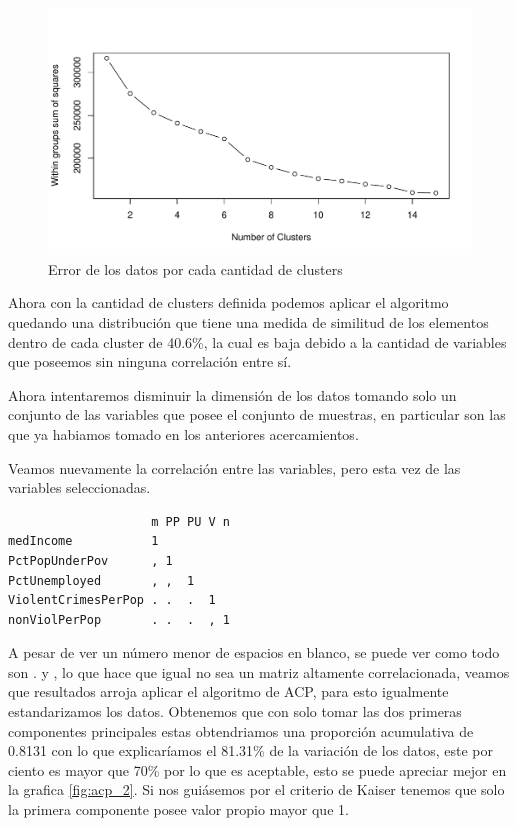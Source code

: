 \documentclass[a4paper,10pt,twocolumn]{article}
\begin{document}
	\begin{figure}[htb]
		\begin{center}
			\includegraphics[width=\columnwidth]{figures/cluster_n_1.pdf}
		\end{center}
		\caption{Error de los datos por cada cantidad de clusters \label{fig:cluster_n_1}}%
	\end{figure}

	Ahora con la cantidad de clusters definida podemos aplicar el algoritmo quedando una distribución que tiene una medida de similitud de los elementos dentro de cada cluster de 40.6\%, la cual es baja debido a la cantidad de variables que poseemos sin ninguna correlación entre sí.

	Ahora intentaremos disminuir la dimensión de los datos tomando solo un conjunto de las variables que posee el conjunto de muestras, en particular son las que ya habiamos tomado en los anteriores acercamientos.

	Veamos nuevamente la correlación entre las variables, pero esta vez de las variables seleccionadas.

	\begin{verbatim}
                    m PP PU V n
medIncome           1          
PctPopUnderPov      , 1        
PctUnemployed       , ,  1     
ViolentCrimesPerPop . .  .  1  
nonViolPerPop       . .  .  , 1
	\end{verbatim}

	A pesar de ver un número menor de espacios en blanco, se puede ver como todo son . y , lo que hace que igual no sea un matriz altamente correlacionada, veamos que resultados arroja aplicar el algoritmo de ACP, para esto igualmente estandarizamos los datos. Obtenemos que con solo tomar las dos primeras componentes principales estas obtendriamos una proporción acumulativa de 0.8131 con lo que explicaríamos el 81.31\% de la variación de los datos, este por ciento es mayor que 70\% por lo que es aceptable, esto se puede apreciar mejor en la grafica \ref{fig:acp_2}. Si nos guiásemos por el criterio de Kaiser tenemos que solo la primera componente posee valor propio mayor que 1.
\end{document}
